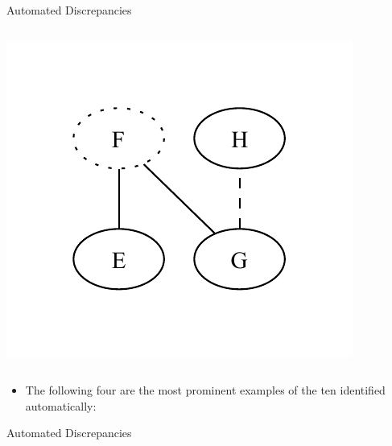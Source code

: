 \documentclass{beamer}
\begin{document}
\begin{frame}{Automated Discrepancies}
\begin{columns}[c]
\begin{column}{.4\textwidth}
            \includegraphics[width=\textwidth]{assets/graphs/SynExampleGlossaryGraph.pdf}
        \end{column}
    \end{columns} \pause
    \vspace{-0.25cm}
    \begin{itemize}
        \item The following four are the most prominent examples of the ten
              identified automatically:
    \end{itemize}
\end{frame}

\begin{frame}{Automated Discrepancies}
    \begin{enumerate}
        
    \end{enumerate}
\end{frame}


%   
\end{document}
